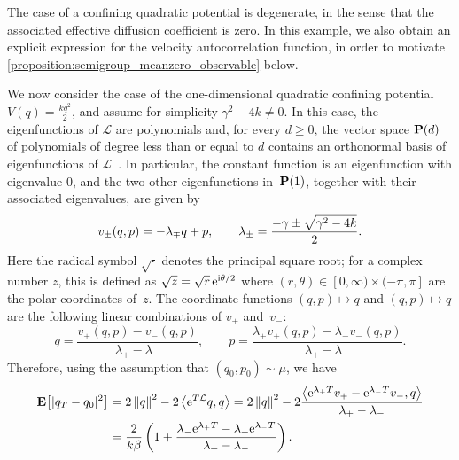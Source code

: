 \documentclass[11pt,a4paper]{article}
\begin{document}
The case of a confining quadratic potential is degenerate,
in the sense that the associated effective diffusion coefficient is zero.
In this example,
we also obtain an explicit expression for the velocity autocorrelation function,
in order to motivate \cref{proposition:semigroup_meanzero_observable} below.
\begin{example}
    \label{example:quadratic}
    We now consider the case of the one-dimensional quadratic confining potential $V(q) = \frac{k q^2}{2}$,
    and assume for simplicity $\gamma^2 - 4 k \neq 0$.
    In this case, the eigenfunctions of $\mathcal L$ are polynomials
    and, for every $d \geq 0$, the vector space $\mathbf P(d)$ of polynomials of degree less than or equal to $d$
    contains an orthonormal basis of eigenfunctions of $\mathcal L$~\cite[Section~6.3]{pavliotis2011applied}.
    In particular, the constant function is an eigenfunction with eigenvalue 0,
    and the two other eigenfunctions in~$\mathbf P(1)$, together with their associated eigenvalues,
    are given by
    \begin{equation*}
        v_{\pm}(q, p) =
        - \lambda_{\mp} q + p, \\
        \qquad
        \lambda_{\pm} = \frac{- \gamma \pm \sqrt{\gamma^2 - 4k}}{2}.
    \end{equation*}
    Here the radical symbol $\sqrt{\cdot}$ denotes the principal square root;
    for a complex number $z$, this is defined as $\sqrt{z} = \sqrt{r} \, \mathrm{e}^{\mathrm{i} \theta/2}$ where $(r, \theta) \in [0, \infty) \times (-\pi, \pi]$ are the polar coordinates of~$z$.
    The coordinate functions $(q, p) \mapsto q$ and $(q, p) \mapsto q$ are the following linear combinations of $v_+$ and~$v_-$:
    \[
        q = \frac{v_+(q,p) - v_-(q,p)}{\lambda_+ - \lambda_-},
        \qquad
        p = \frac{\lambda_+ v_+(q,p) - \lambda_- v_-(q,p)}{\lambda_+ - \lambda_-}.
    \]
    Therefore,
    using the assumption that $(q_0, p_0) \sim \mu$,
    we have
    \begin{align*}
        \expect \bigl[ \lvert q_T - q_0 \rvert^2 \bigr]
        &= 2 \norm{q}^2 - 2 \ip{\e^{T \mathcal L}q}{q}
        = 2 \norm{q}^2 - 2 \frac{\ip{\e^{\lambda_+ T} v_+ - \e^{\lambda_- T} v_-}{q}}{\lambda_+ - \lambda_-} \\
        &= \frac{2}{k \beta} \left( 1 +  \frac{\lambda_- \e^{\lambda_+ T} - \lambda_+ \e^{\lambda_- T}}{\lambda_+ - \lambda_-} \right).

\end{align*}
\end{example}
\end{document}

